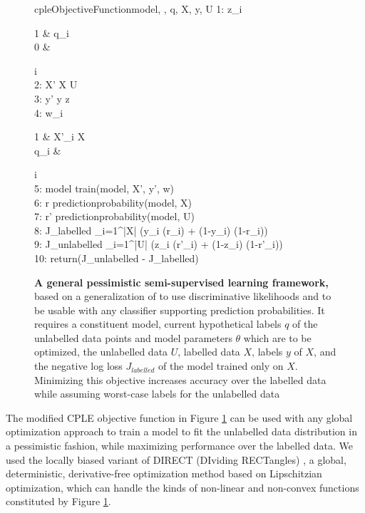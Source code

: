 \documentclass[12pt,PhD,twoside]{muthesis}
\begin{document}
\begin{figure}[h]
	\begin{pseudocode}{cpleObjectiveFunction}{model, \theta, q, X, y, U}
		1:  \enspace z_i \GETS \begin{cases}
			1 &  q_i \\
			0 & 
		\end{cases} \enspace {} \enspace i \in [1, |U|] \\
		2: X' \GETS X \cup U \\
		3: y' \GETS y \cup z \\
		4:  \enspace w_i \GETS \begin{cases}
			1 &  X'_i \in X \\
			q_i & 
		\end{cases} \enspace {} \enspace i \in [1, |X'|] \\
		5: model \GETS train(model, X', y', w) \\
		6: r \GETS predictionprobability(model, X) \\
		7: r' \GETS predictionprobability(model, U) \\
		8: J_{labelled} \GETS {} \sum_{i=1}^{|X|} (y_i  (r_i) + (1-y_i)  (1-r_i)) \\
		9: J_{unlabelled} \GETS {} \sum_{i=1}^{|U|} (z_i  (r'_i) + (1-z_i)  (1-r'_i)) \\
		10: return(J_{unlabelled} - J_{labelled})
	\end{pseudocode}
	\caption[Objective function for a general pessimistic semi-supervised learning framework]{\textbf{A general pessimistic semi-supervised learning framework,} based on a generalization of \citep{loog2015contrastive} to use discriminative likelihoods and to be usable with any classifier supporting prediction probabilities. It requires a constituent model, current hypothetical labels $q$ of the unlabelled data points and model parameters $\theta$ which are to be optimized, the unlabelled data $U$, labelled data $X$, labels $y$ of $X$, and the negative log loss $J_{labelled}$ of the model trained only on $X$. Minimizing this objective increases accuracy over the labelled data while assuming worst-case labels for the unlabelled data}
	\label{cplealg}
\end{figure}


The modified CPLE objective function in Figure \ref{cplealg} can be used with any global optimization approach to train a model to fit the unlabelled data distribution in a pessimistic fashion, while maximizing performance over the labelled data. We used the locally biased variant \citep{gablonsky2001locally} of DIRECT (DIviding RECTangles) \citep{jones1993lipschitzian}, a global, deterministic, derivative-free optimization method based on Lipschitzian optimization, which can handle the kinds of non-linear and non-convex functions constituted by Figure \ref{cplealg}. 
\end{document}
